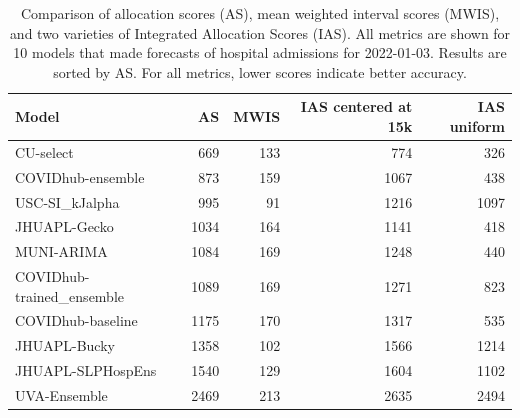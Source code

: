 \documentclass{article}\usepackage[]{graphicx}\usepackage[]{xcolor}
\begin{document}
\begin{table}[ht]
\centering
\begin{tabular}{lrrrr}
  \hline
Model & AS & MWIS & IAS centered at 15k & IAS uniform \\ 
  \hline
CU-select & 669 & 133 & 774 & 326 \\ 
  COVIDhub-ensemble & 873 & 159 & 1067 & 438 \\ 
  USC-SI\_kJalpha & 995 & 91 & 1216 & 1097 \\ 
  JHUAPL-Gecko & 1034 & 164 & 1141 & 418 \\ 
  MUNI-ARIMA & 1084 & 169 & 1248 & 440 \\ 
  COVIDhub-trained\_ensemble & 1089 & 169 & 1271 & 823 \\ 
  COVIDhub-baseline & 1175 & 170 & 1317 & 535 \\ 
  JHUAPL-Bucky & 1358 & 102 & 1566 & 1214 \\ 
  JHUAPL-SLPHospEns & 1540 & 129 & 1604 & 1102 \\ 
  UVA-Ensemble & 2469 & 213 & 2635 & 2494 \\ 
   \hline
\end{tabular}
\caption{Comparison of allocation scores (AS), mean weighted interval scores (MWIS), and two varieties of Integrated Allocation Scores (IAS). All metrics are shown for 10 models that made forecasts of hospital admissions for 2022-01-03. Results are sorted by AS. For all metrics, lower scores indicate better accuracy.} 
\label{tab:multi-k-scores}
\end{table}







\end{document}
